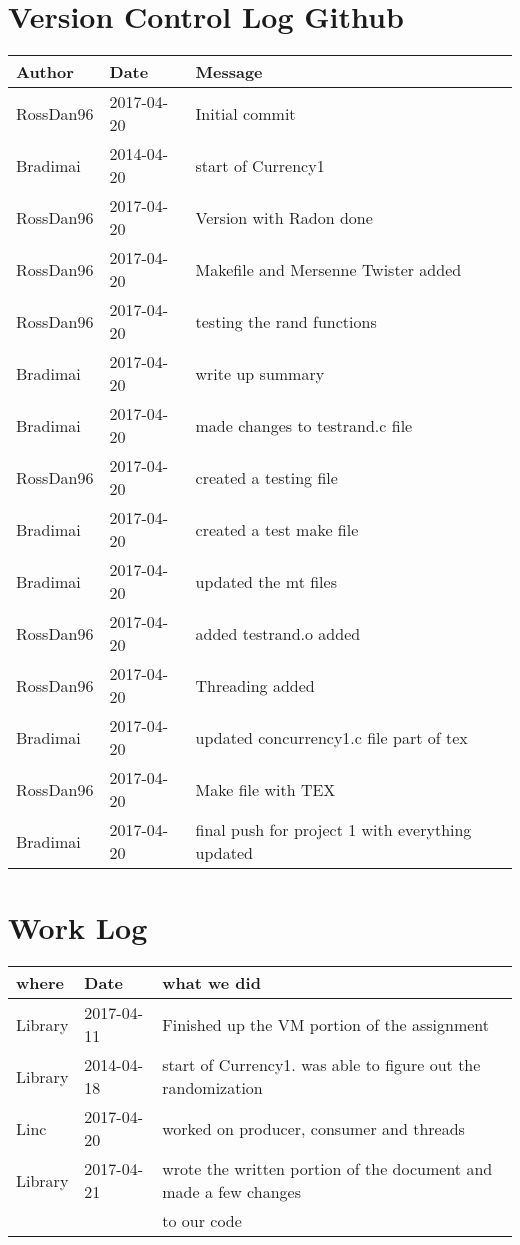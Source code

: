 \documentclass[letterpaper,10pt,titlepage]{article}
\begin{document}
\section{Version Control Log Github}
\begin{tabular}{lll} \textbf{Author}
     & \textbf{Date}
     & \textbf{Message}
\\ \hline
RossDan96 & 2017-04-20 & Initial commit \\ \hline
Bradimai & 2014-04-20 & start of Currency1 \\ \hline
RossDan96 & 2017-04-20 & Version with Radon done \\ \hline
RossDan96 & 2017-04-20 & Makefile and Mersenne Twister added \\ \hline
RossDan96 & 2017-04-20 & testing the rand functions \\ \hline
Bradimai & 2017-04-20 & write up summary \\ \hline
Bradimai & 2017-04-20 & made changes to testrand.c file \\ \hline
RossDan96 & 2017-04-20 & created a testing file \\ \hline
Bradimai & 2017-04-20 & created a test make file \\ \hline
Bradimai & 2017-04-20 & updated the mt files \\ \hline
RossDan96 & 2017-04-20 & added testrand.o added \\ \hline
RossDan96 & 2017-04-20 & Threading added \\ \hline
Bradimai & 2017-04-20 & updated concurrency1.c file part of tex \\ \hline
RossDan96 & 2017-04-20 & Make file with TEX \\ \hline
Bradimai & 2017-04-20 & final push for project 1 with everything updated\\ \hline
\end{tabular}

\section{Work Log}

\begin{tabular}{lll} \textbf{where}
     & \textbf{Date}
     & \textbf{what we did}

\\ \hline
Library & 2017-04-11 & Finished up the VM portion of the assignment \\ \hline
Library & 2014-04-18 & start of Currency1. was able to figure out the randomization \\ \hline
Linc & 2017-04-20 &  worked on producer, consumer and threads\\ \hline
Library & 2017-04-21 & wrote the written portion of the document and made a few changes\\&& to our code \\ \hline

\end{tabular}
\end{document}
